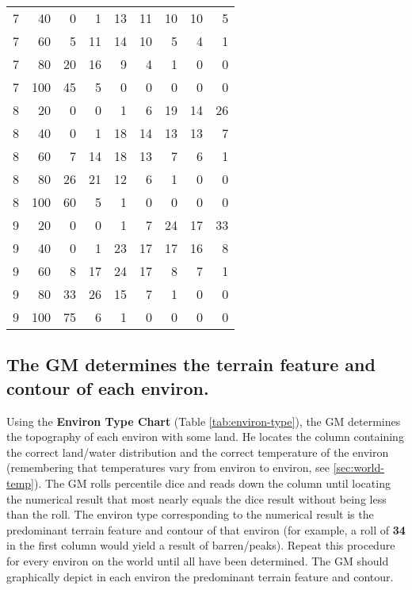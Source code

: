 \begin{table}[htbp]
{\begin{minipage}{3.5in}
\begin{tabular}{crrrrrrrr}
        \rowcolor{grey}
        7 & 40 & 0 & 1 & 13 & 11 & 10 & 10 & 5\\
        7 & 60 & 5 & 11 & 14 & 10 & 5 & 4 & 1\\
        \rowcolor{grey}
        7 & 80 & 20 & 16 & 9 & 4 & 1 & 0 & 0\\
        7 & 100 & 45 & 5 & 0 & 0 & 0 & 0 & 0\\
        \rowcolor{grey}
        8 & 20 & 0 & 0 & 1 & 6 & 19 & 14 & 26\\
        8 & 40 & 0 & 1 & 18 & 14 & 13 & 13 & 7\\
        \rowcolor{grey}
        8 & 60 & 7 & 14 & 18 & 13 & 7 & 6 & 1\\
        8 & 80 & 26 & 21 & 12 & 6 & 1 & 0 & 0\\
        \rowcolor{grey}
        8 & 100 & 60 & 5 & 1 & 0 & 0 & 0 & 0\\
        9 & 20 & 0 & 0 & 1 & 7 & 24 & 17 & 33\\
        \rowcolor{grey}
        9 & 40 & 0 & 1 & 23 & 17 & 17 & 16 & 8\\
        9 & 60 & 8 & 17 & 24 & 17 & 8 & 7 & 1\\
        \rowcolor{grey}
        9 & 80 & 33 & 26 & 15 & 7 & 1 & 0 & 0\\
        9 & 100 & 75 & 6 & 1 & 0 & 0 & 0 & 0
      \end{tabular}
    \end{minipage}}
\end{table}
\renewcommand{\thetable}{\thesection}

\subsection[Terrain and Contour]{The GM determines the terrain
  feature and contour of each environ.}
\label{sec:terrain-contour}

Using the \textbf{Environ Type Chart} (Table \vref{tab:environ-type}),
the GM 
determines the topography of each environ with some land. He locates
the column containing the correct land/water distribution and the
correct temperature of the environ (remembering that temperatures vary
from environ to environ, see \ref{sec:world-temp}). The GM rolls
percentile dice and reads down the column until locating the numerical
result that most nearly equals the dice result without being less
than the roll. The environ type corresponding to the numerical result
is the predominant terrain feature and contour of that environ (for
example, a roll of \textbf{34} in the first column would yield a
result of barren/peaks). Repeat this procedure for every environ on
the world until all have been determined. The GM should graphically
depict in each environ the predominant terrain feature and contour.

